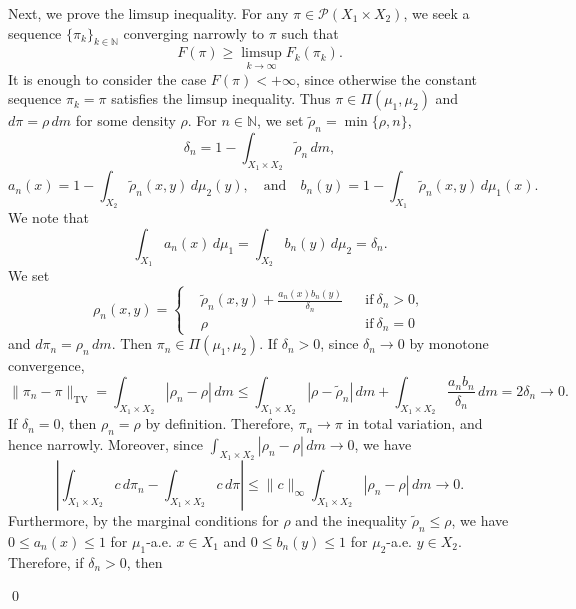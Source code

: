 \documentclass[a4paper,11pt]{article}
\theoremstyle{plain}
\theoremstyle{definition}
\theoremstyle{remark}
\theoremstyle{plain}
\newenvironment{pf}[1]
{{\noindent\textbf{Proof of #1.}}}{\hfill \qed}
\numberwithin{equation}{section}
\newcommand{\N}{\mathbb N}
\newcommand{\dl}{\delta}
\newcommand{\1}{\mbox{1}\hspace{-0.25em}\mbox{l}} %
\begin{document}
\begin{pf}{Theorem \ref{thm;narrow}}
Next, we prove the limsup inequality. For any $\pi\in\mathcal P(X_1\times X_2)$, we seek a sequence $\{\pi_k\}_{k\in\N}$ converging narrowly to $\pi$ such that
\begin{equation}\label{limsup;0}
  F(\pi) \geq \limsup_{k \to \infty} F_k(\pi_k).
\end{equation}
It is enough to consider the case $F(\pi)<+\infty$, since otherwise the constant sequence $\pi_k = \pi$ satisfies the limsup inequality. Thus $\pi\in\Pi(\mu_1,\mu_2)$ and $d\pi=\rho\,dm$ for some density $\rho$.
For $n \in \N$, we set $\tilde{\rho}_n = \min\{\rho, n\}$, 
\begin{equation*}
  \dl_n = 1 - \int_{X_1 \times X_2} \tilde{\rho}_n\, dm,
\end{equation*}
\begin{equation*}
a_n(x) = 1 - \int_{X_2} \tilde{\rho}_n(x, y)\, d\mu_2(y), \quad \mathrm{and} \quad b_n(y) = 1 - \int_{X_1} \tilde{\rho}_n(x, y)\, d\mu_1(x). 
\end{equation*}
We note that
\begin{equation*}
\int_{X_1} a_n(x)\, d\mu_1 = \int_{X_2} b_n(y)\, d\mu_2 = \dl_n.
\end{equation*}
We set 
\begin{equation*}
\rho_n(x, y) = \left\{
    \begin{aligned}
    &\tilde{\rho}_n(x, y) + \frac{a_n(x) b_n(y)}{\dl_n}
    && \mathrm{if}\ \dl_n > 0, \\
    &\rho
    && \mathrm{if}\ \dl_n = 0
    \end{aligned}
    \right.
\end{equation*}
and $d\pi_n =\rho_n\,dm$. Then $\pi_n \in \Pi(\mu_1, \mu_2)$. If $\dl_n>0$, since $\dl_n\to0$ by monotone convergence,
\begin{equation*}
\|\pi_n-\pi\|_{\mathrm{TV}} = \int_{X_1\times X_2}|\rho_n-\rho|\,dm \leq \int_{X_1\times X_2} |\rho-\tilde\rho_n| \,dm +\int_{X_1\times X_2}\frac{a_nb_n}{\dl_n}\,dm = 2\dl_n\to0. 
\end{equation*}
If $\dl_n=0$, then $\rho_n=\rho$ by definition. Therefore, $\pi_n\to\pi$ in total variation, and hence narrowly.
Moreover, since $\int_{X_1\times X_2}|\rho_n-\rho|\,dm\to0$, we have
\begin{equation}\label{limsup;2}
\left|\int_{X_1\times X_2}c\,d\pi_n-\int_{X_1\times X_2}c\,d\pi\right|
\leq \|c\|_\infty\int_{X_1\times X_2}|\rho_n-\rho|\,dm\to0.
\end{equation}
Furthermore, by the marginal conditions for $\rho$ and the inequality $\tilde{\rho}_n\leq\rho$, we have $0\leq a_n(x)\leq1$ for $\mu_1$-a.e. $x\in X_1$ and $0\leq b_n(y)\leq1$ for $\mu_2$-a.e. $y\in X_2$. Therefore, if $\dl_n>0$, then

\end{pf}
\end{document}
